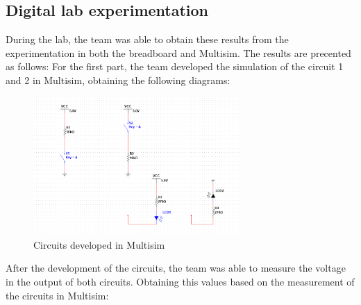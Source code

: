 \documentclass[12pt]{article}  %
\begin{document}
\subsection{Digital lab experimentation}
During the lab, the team was able to obtain these results from the experimentation in both the breadboard and Multisim. The results are precented as follows:
For the first part, the team developed the simulation of the circuit 1 and 2 in Multisim, obtaining the following diagrams:
\begin{figure}[H]
    \centering
    \includegraphics[width=0.7\textwidth]{Circuit 1 and 2.png}
    \caption{Circuits developed in Multisim}
    \label{fig:multisim_circuits}
\end{figure}
After the development of the circuits, the team was able to measure the voltage in the output of both circuits. Obtaining this values based on the measurement of the circuits in Multisim:
\end{document}
